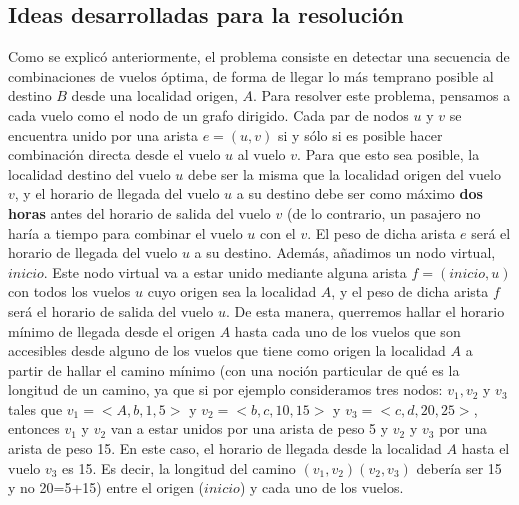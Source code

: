 \documentclass[11pt, a4paper, twoside]{article}
\begin{document}
\subsection{Ideas desarrolladas para la resolución}
Como se explicó anteriormente, el problema consiste en detectar una secuencia de 
combinaciones de vuelos óptima, de forma de llegar lo más temprano posible al destino $B$
desde una localidad origen, $A$.
Para resolver este problema, pensamos a cada vuelo como el nodo de un grafo dirigido.
Cada par de nodos $u$ y $v$ se encuentra unido por una arista $e = (u,v)$ si y sólo si 
es posible hacer combinación directa desde el vuelo $u$ al vuelo $v$. Para que esto sea 
posible, la localidad destino del vuelo $u$ debe ser la misma que la localidad origen
del vuelo $v$, y el horario de llegada del vuelo $u$ a su destino debe ser como máximo 
\textbf{dos horas} antes del horario de salida del vuelo $v$ (de lo contrario, un pasajero
no haría a tiempo para combinar el vuelo $u$ con el $v$. El peso de dicha arista $e$ será
el horario de llegada del vuelo $u$ a su destino.
Además, añadimos un nodo virtual, 
$inicio$. Este nodo virtual va a estar unido mediante alguna arista $f = (inicio,u) $ con
todos los vuelos $u$ cuyo origen sea la localidad $A$, y el peso de dicha arista $f$ será 
el horario de salida del vuelo $u$. De esta manera, querremos hallar el horario mínimo de llegada
desde el origen $A$ hasta cada uno de los vuelos que son accesibles desde alguno de los vuelos 
que tiene como origen la localidad $A$ a partir de hallar el camino mínimo (con una noción 
particular de qué es la longitud de un camino, ya que si por ejemplo consideramos tres nodos: $v_{1},
v_{2}$ y $v_{3}$ tales que $v_{1} = <A,b,1,5>$ y $v_{2} = <b,c,10,15>$ y $v_{3} = <c,d,20,25>$, entonces
$v_{1}$ y $v_{2}$ van a estar unidos por una arista de peso 5 y $v_{2}$ y $v_{3}$ por una arista de
peso 15. En este caso, el horario de llegada desde la localidad $A$ hasta el vuelo $v_{3}$ es 15.
Es decir, la longitud del camino $(v_{1},v_{2})(v_{2},v_{3})$ debería ser 15 y no 20=5+15)
entre el origen ($inicio$) y cada uno de los vuelos.
\end{document}
